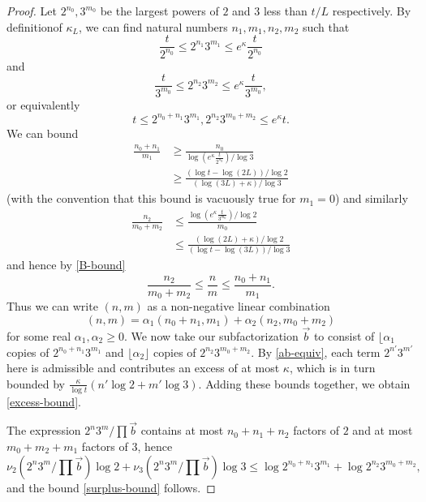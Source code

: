 \documentclass[12pt,a4paper,reqno]{amsart}
\numberwithin{equation}{section}
\theoremstyle{plain}
\theoremstyle{definition}
\begin{document}
\begin{proof}  Let $2^{n_0}, 3^{m_0}$ be the largest powers of $2$ and $3$ less than $t/L$ respectively.  By definitionof $\kappa_L$, we can find natural numbers $n_1,m_1,n_2,m_2$ such that
\begin{equation}\label{ab} 
  \frac{t}{2^{n_0}} \leq 2^{n_1} 3^{m_1} \leq e^{\kappa} \frac{t}{2^{n_0}}
\end{equation}
and
\begin{equation}\label{ab-2}
 \frac{t}{3^{m_0}} \leq 2^{n_2} 3^{m_2} \leq e^{\kappa} \frac{t}{3^{m_0}},
\end{equation}
or equivalently
\begin{equation}\label{ab-equiv} 
  t \leq 2^{n_0+n_1} 3^{m_1}, 2^{n_2} 3^{m_0+m_2} \leq e^{\kappa} t.
\end{equation}
We can bound
\begin{align*}
  \frac{n_0 + n_1}{m_1} &\geq \frac{n_0}{\log (e^{\kappa} \frac{t}{2^{n_0}}) / \log 3} \\
  &\geq \frac{(\log t - \log(2L)) / \log 2}{ (\log(3L)+\kappa) / \log 3 }
\end{align*}
(with the convention that this bound is vacuously true for $m_1=0$) and similarly
\begin{align*}
  \frac{n_2}{m_0+m_2} &\leq \frac{\log(e^\kappa \frac{t}{3^{m_0}}) / \log 2}{m_0} \\
  &\leq \frac{(\log(2L)+\kappa)/\log 2}{(\log t-\log(3L))/\log 3}
\end{align*}
and hence by \eqref{B-bound}
\begin{equation}\label{m-wedge} \frac{n_2}{m_0+m_2} \leq \frac{n}{m} \leq \frac{n_0+n_1}{m_1}.
\end{equation}
Thus we can write $(n,m)$ as a non-negative linear combination
$$ (n,m) = \alpha_1 (n_0+n_1,m_1) + \alpha_2 (n_2,m_0+m_2)$$
for some real $\alpha_1, \alpha_2 \geq 0$. We now take our subfactorization $\vec b$ to consist of $\lfloor \alpha_1$ copies of $2^{n_0+n_1} 3^{m_1}$ and $\lfloor \alpha_2 \rfloor$ copies of $2^{n_2} 3^{m_0+m_2}$.  By \eqref{ab-equiv}, each term $2^{n'} 3^{m'}$ here is admissible and contributes an excess of at most $\kappa$, which is in turn bounded by $\frac{\kappa}{\log t} (n' \log 2 + m' \log 3)$.  Adding these bounds together, we obtain \eqref{excess-bound}.

The expression $2^n 3^m / \prod \vec b$ contains at most $n_0+n_1+n_2$ factors of $2$ and at most $m_0+m_2+m_1$ factors of $3$, hence
$$ \nu_2(2^n 3^m / \prod \vec b) \log 2 +
\nu_3(2^n 3^m / \prod \vec b) \log 3
\leq \log 2^{n_0+n_1} 3^{m_1} + \log 2^{n_2} 3^{m_0+m_2},$$
and the bound \eqref{surplus-bound} follows.
\end{proof}
\end{document}
